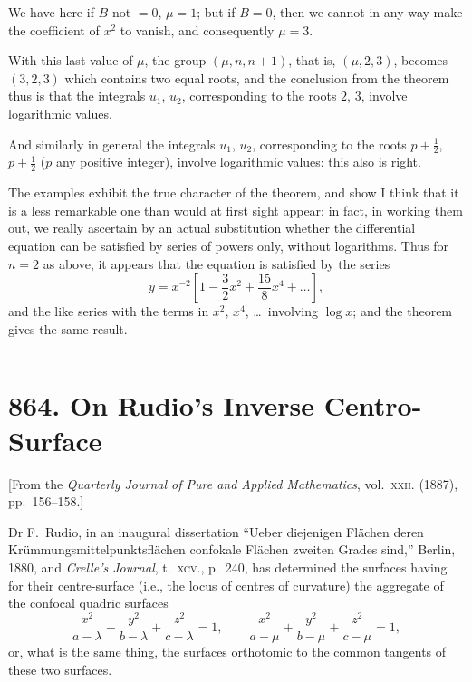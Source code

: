 \documentclass[11pt,a4paper]{article}
\theoremstyle{definition}
\begin{document}
We have here if $B$ not $= 0$, $\mu = 1$; but if $B = 0$, then we cannot in any way make the coefficient of $x^2$ to vanish, and consequently $\mu = 3$.

With this last value of $\mu$, the group $(\mu, n, n + 1)$, that is, $(\mu, 2, 3)$, becomes $(3, 2, 3)$ which contains two equal roots, and the conclusion from the theorem thus is that the integrals $u_1$, $u_2$, corresponding to the roots $2$, $3$, involve logarithmic values.

And similarly in general the integrals $u_1$, $u_2$, corresponding to the roots $p + \tfrac{1}{2}$, $p + \tfrac{1}{2}$ ($p$ any positive integer), involve logarithmic values: this also is right.

The examples exhibit the true character of the theorem, and show I think that it is a less remarkable one than would at first sight appear: in fact, in working them out, we really ascertain by an actual substitution whether the differential equation can be satisfied by series of powers only, without logarithms. Thus for $n = 2$ as above, it appears that the equation is satisfied by the series
\[
y = x^{-2}\left[1 - \frac{3}{2}x^2 + \frac{15}{8}x^4 + \ldots\right],
\]
and the like series with the terms in $x^2$, $x^4$, \ldots\ involving $\log x$; and the theorem gives the same result.

\vspace{12pt}
\hrule
\vspace{12pt}

\section*{864. On Rudio's Inverse Centro-Surface}

\begin{center}
[From the \textit{Quarterly Journal of Pure and Applied Mathematics}, vol.~\textsc{xxii}. (1887), pp.~156--158.]
\end{center}

Dr F.~Rudio, in an inaugural dissertation ``Ueber diejenigen Fl\"achen deren Kr\"ummungsmittelpunktsfl\"achen confokale Fl\"achen zweiten Grades sind,'' Berlin, 1880, and \textit{Crelle's Journal}, t.~\textsc{xcv}., p.~240, has determined the surfaces having for their centre-surface (i.e., the locus of centres of curvature) the aggregate of the confocal quadric surfaces
\[
\frac{x^2}{a - \lambda} + \frac{y^2}{b - \lambda} + \frac{z^2}{c - \lambda} = 1, \qquad
\frac{x^2}{a - \mu} + \frac{y^2}{b - \mu} + \frac{z^2}{c - \mu} = 1,
\]
or, what is the same thing, the surfaces orthotomic to the common tangents of these two surfaces.
\end{document}
